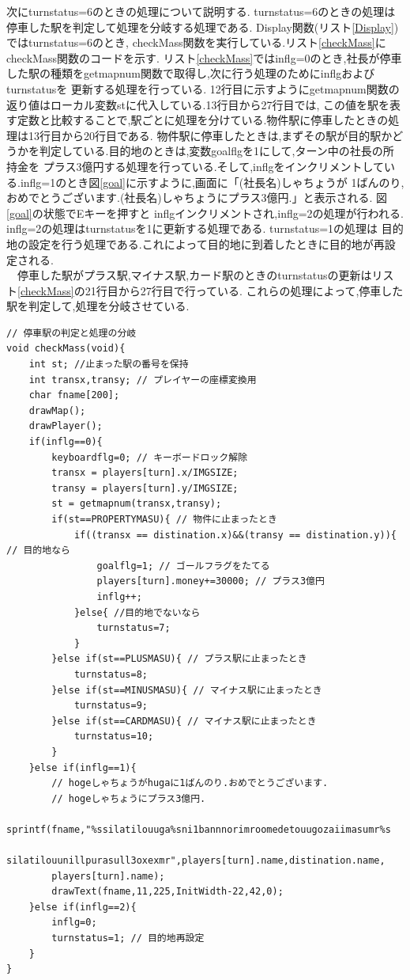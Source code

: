\documentclass[a4j]{jarticle}
\begin{document}
    次にturnstatus=6のときの処理について説明する. turnstatus=6のときの処理は停車した駅を判定して処理を分岐する処理である.
    Display関数(リスト\ref{Display})ではturnstatus=6のとき, checkMass関数を実行している.リスト\ref{checkMass}にcheckMass関数のコードを示す.
    リスト\ref{checkMass}ではinflg=0のとき,社長が停車した駅の種類をgetmapnum関数で取得し,次に行う処理のためにinflgおよびturnstatusを
    更新する処理を行っている. 12行目に示すようにgetmapnum関数の返り値はローカル変数stに代入している.13行目から27行目では,
    この値を駅を表す定数と比較することで,駅ごとに処理を分けている.物件駅に停車したときの処理は13行目から20行目である.
    物件駅に停車したときは,まずその駅が目的駅かどうかを判定している.目的地のときは,変数goalflgを1にして,ターン中の社長の所持金を
    プラス3億円する処理を行っている.そして,inflgをインクリメントしている.inflg=1のとき図\ref{goal}に示すように,画面に「(社長名)しゃちょうが
    1ばんのり,おめでとうございます.(社長名)しゃちょうにプラス3億円.」と表示される. 図\ref{goal}の状態でEキーを押すと
    inflgインクリメントされ,inflg=2の処理が行われる. inflg=2の処理はturnstatusを1に更新する処理である. turnstatus=1の処理は
    目的地の設定を行う処理である.これによって目的地に到着したときに目的地が再設定される.\\
    　停車した駅がプラス駅,マイナス駅,カード駅のときのturnstatusの更新はリスト\ref{checkMass}の21行目から27行目で行っている.
    これらの処理によって,停車した駅を判定して,処理を分岐させている.
    \begin{lstlisting}[basicstyle=\ttfamily\footnotesize, frame=single,label=checkMass,caption=checkMass関数]   
// 停車駅の判定と処理の分岐
void checkMass(void){
    int st; //止まった駅の番号を保持
    int transx,transy; // プレイヤーの座標変換用
    char fname[200];
    drawMap();
    drawPlayer();  
    if(inflg==0){
        keyboardflg=0; // キーボードロック解除
        transx = players[turn].x/IMGSIZE;
        transy = players[turn].y/IMGSIZE;
        st = getmapnum(transx,transy);
        if(st==PROPERTYMASU){ // 物件に止まったとき
            if((transx == distination.x)&&(transy == distination.y)){ // 目的地なら
                goalflg=1; // ゴールフラグをたてる
                players[turn].money+=30000; // プラス3億円
                inflg++;
            }else{ //目的地でないなら
                turnstatus=7;
            }
        }else if(st==PLUSMASU){ // プラス駅に止まったとき
            turnstatus=8;
        }else if(st==MINUSMASU){ // マイナス駅に止まったとき
            turnstatus=9;
        }else if(st==CARDMASU){ // マイナス駅に止まったとき
            turnstatus=10;
        }
    }else if(inflg==1){
        // hogeしゃちょうがhugaに1ばんのり.おめでとうございます.
        // hogeしゃちょうにプラス3億円.
        sprintf(fname,"%ssilatilouuga%sni1bannnorimroomedetouugozaiimasumr%s
        silatilouunillpurasull3oxexmr",players[turn].name,distination.name,
        players[turn].name);
        drawText(fname,11,225,InitWidth-22,42,0);              
    }else if(inflg==2){
        inflg=0;
        turnstatus=1; // 目的地再設定
    }
} 
    \end{lstlisting} 
\end{document}
